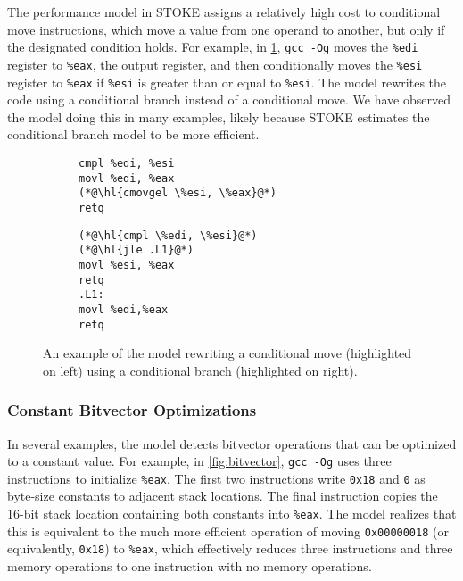 \documentclass{article}
\begin{document}
The performance model in STOKE assigns a relatively high cost to conditional move instructions, which move a value from one operand to another, but only if the designated condition holds.  For example, in \cref{fig:conditional_move}, \texttt{gcc -Og} moves the \lstinline{%edi} register to \lstinline{%eax}, the output register, and then conditionally moves the \lstinline{%esi} register to \lstinline{%eax} if \lstinline{%esi} is greater than or equal to \lstinline{%esi}.
%
The model rewrites the code using a conditional branch instead of a conditional move.  We have observed the model doing this in many examples, likely because STOKE estimates the conditional branch model to be more efficient.

\begin{figure}
    \centering
    \begin{subfigure}[t]{\codeboxwidth}
    \begin{lstlisting}[language={[x64]Assembler}]
cmpl %edi, %esi     
movl %edi, %eax    
(*@\hl{cmovgel \%esi, \%eax}@*)
retq 
\end{lstlisting}
    \caption{\ogcodecaption}
    \end{subfigure}
    \hfil
    \begin{subfigure}[t]{\codeboxwidth}
    \begin{lstlisting}
(*@\hl{cmpl \%edi, \%esi}@*)     
(*@\hl{jle .L1}@*)
movl %esi, %eax
retq
.L1:
movl %edi,%eax
retq
\end{lstlisting}
    \caption{\modelcodecaption}
    \end{subfigure}
    \caption{An example of the model rewriting a conditional move (highlighted on left) using a conditional branch (highlighted on right).}
    \label{fig:conditional_move}
\end{figure}

\subsubsection{Constant Bitvector Optimizations}

In several examples, the model detects bitvector operations that can be optimized to a constant value.  For example, in \cref{fig:bitvector}, \texttt{gcc -Og} uses three instructions to initialize \lstinline{%eax}. The first two instructions write \lstinline{0x18} and \lstinline{0} as byte-size constants to adjacent stack locations.  The final instruction copies the 16-bit stack location containing both constants into \lstinline{%eax}.  The model realizes that this is equivalent to the much more efficient operation of moving \lstinline{0x00000018} (or equivalently, \lstinline{0x18}) to \lstinline{%eax}, which effectively reduces three instructions and three memory operations to one instruction with no memory operations.
\end{document}
